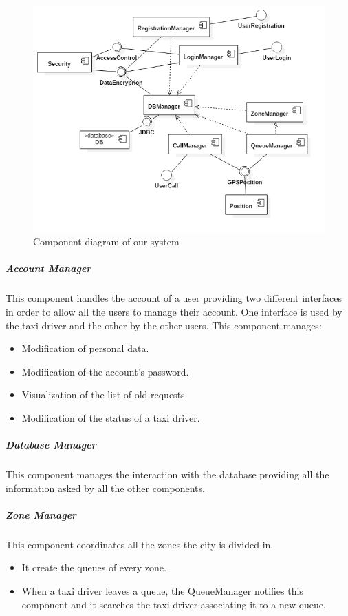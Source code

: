 \begin{figure}[H]
    \centering
    \includegraphics[width=14cm]{./Images/ComponentDiagram.png}
    \caption{Component diagram of our system}
    \label{fig:component-diagram}
\end{figure}


\subparagraph{Account Manager}
This component handles the account of a user providing two different interfaces in order to allow all the users to manage their account. One interface is used by the taxi driver and the other by the other users.
This component manages:
\begin{itemize}
    \item Modification of personal data.
    \item Modification of the account's password.
    \item Visualization of the list of old requests.
    \item Modification of the status of a taxi driver.
\end{itemize}

\subparagraph{Database Manager}
This component manages the interaction with the database providing all the information asked by all the other components.

\subparagraph{Zone Manager}
This component coordinates all the zones the city is divided in.
\begin{itemize}
    \item It create the queues of every zone.
    \item When a taxi driver leaves a queue, the QueueManager notifies this component and it searches the taxi driver associating it to a new queue.
\end{itemize}

